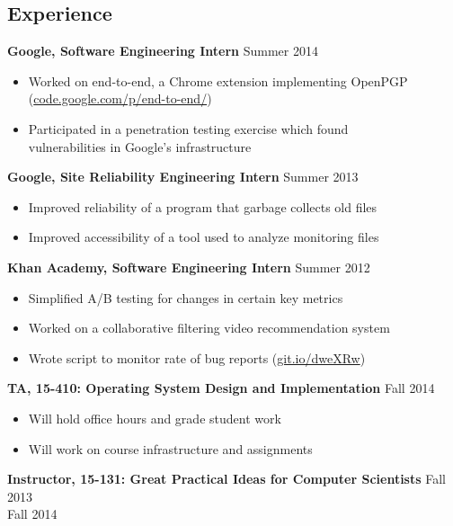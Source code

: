 \documentclass[margin]{res}
\begin{document}
\begin{resume}
\section{Experience}
  \textbf{Google, Software Engineering Intern} \hfill Summer 2014
  \begin{itemize} \itemsep -2pt  %
    \item Worked on end-to-end, a Chrome extension implementing OpenPGP\\
      (\href{https://code.google.com/p/end-to-end/}{code.google.com/p/end-to-end/})
    \item Participated in a penetration testing exercise which found \\
      vulnerabilities in Google's infrastructure
  \end{itemize}
  \textbf{Google, Site Reliability Engineering Intern}
    \hfill Summer 2013
  \begin{itemize} \itemsep -2pt  %
    \item Improved reliability of a program that garbage collects old files
    \item Improved accessibility of a tool used to analyze monitoring files
  \end{itemize}

  \textbf{Khan Academy, Software Engineering Intern} \hfill Summer 2012
  \begin{itemize} \itemsep -2pt %
  \item Simplified A/B testing for changes in certain key metrics
  \item Worked on a collaborative filtering video recommendation system
  \item Wrote script to monitor rate of bug reports
    (\href{https://github.com/Khan/beep-boop}{git.io/dweXRw})
  \end{itemize}


  \textbf{TA, 15-410: Operating System Design and Implementation} \hfill Fall 2014
  \begin{itemize} \itemsep -2pt
      \item Will hold office hours and grade student work
      \item Will work on course infrastructure and assignments
    \end{itemize}

  \textbf{Instructor, 15-131: Great Practical Ideas for Computer Scientists}
    \hfill Fall 2013 \\ \hphantom{1em} \hfill Fall 2014


\end{resume}
\end{document}
